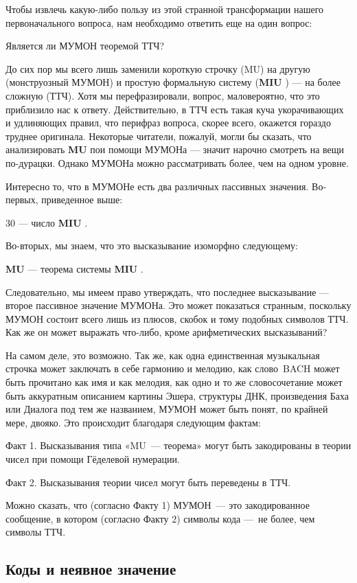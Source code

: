 \documentclass[../main.tex]{subfiles}
\begin{document}
Чтобы извлечь какую-либо пользу из этой странной трансформации нашего первоначального вопроса, нам необходимо ответить еще на один вопрос:

Является ли МУМОН теоремой ТТЧ?

До сих пор мы всего лишь заменили короткую строчку (MU) на другую (монструозный МУМОН) и простую формальную систему (\textbf{MIU} ) --- на более сложную (ТТЧ). Хотя мы перефразировали, вопрос, маловероятно, что это приблизило нас к ответу. Действительно, в ТТЧ есть такая куча укорачивающих и удлиняющих правил, что перифраз вопроса, скорее всего, окажется гораздо труднее оригинала. Некоторые читатели, пожалуй, могли бы сказать, что анализировать \textbf{MU} пои помощи МУМОНа --- значит нарочно смотреть на вещи по-дурацки. Однако МУМОНа можно рассматривать более, чем на одном уровне.

Интересно то, что в МУМОНе есть два различных пассивных значения. Во-первых, приведенное выше:

30 --- число \textbf{MIU} .

Во-вторых, мы знаем, что это высказывание изоморфно следующему:

\textbf{MU} --- теорема системы \textbf{MIU} .

Следовательно, мы имеем право утверждать, что последнее высказывание --- второе пассивное значение МУМОНа. Это может показаться странным, поскольку МУМОН состоит всего лишь из плюсов, скобок и тому подобных символов ТТЧ. Как же он может выражать что-либо, кроме арифметических высказываний?

На самом деле, это возможно. Так же, как одна единственная музыкальная строчка может заключать в себе гармонию и мелодию, как слово~BACH может быть прочитано как имя и как мелодия, как одно и то же словосочетание может быть аккуратным описанием картины Эшера, структуры ДНК, произведения Баха или Диалога под тем же названием, МУМОН может быть понят, по крайней мере, двояко. Это происходит благодаря следующим фактам:

Факт 1. Высказывания типа «MU~--- теорема» могут быть закодированы в теории чисел при помощи Гёделевой нумерации.

Факт 2. Высказывания теории чисел могут быть переведены в ТТЧ.

Можно сказать, что (согласно Факту 1) МУМОН~--- это закодированное сообщение, в котором (согласно Факту 2) символы кода ---~не более, чем символы ТТЧ.


\subsection{Коды и неявное значение}
\end{document}
